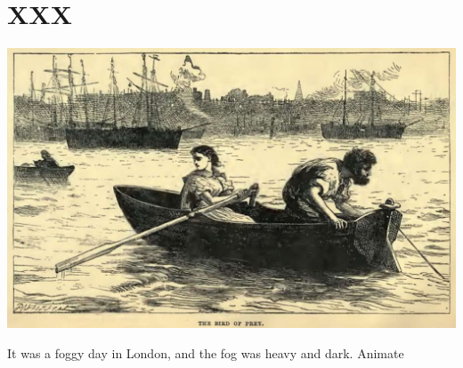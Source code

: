 
\chapter{XXX}

\includegraphics[scale=2.3]{01-01-01}

It was a foggy day in London, and the fog was heavy and dark. Animate
